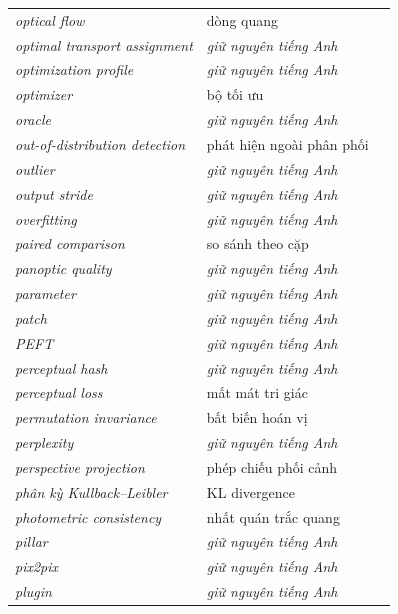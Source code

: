 \documentclass[deep_learning.tex]{subfiles}
\begin{document}
\begin{longtable}{@{}L{5.2cm}L{5.9cm}L{2.6cm}@{}}
\emph{optical flow} & dòng quang & \\
\emph{optimal transport assignment} & \emph{\color{tiercol}giữ nguyên tiếng Anh} & \\
\emph{optimization profile} & \emph{\color{tiercol}giữ nguyên tiếng Anh} & \\
\emph{optimizer} & bộ tối ưu & \\
\emph{oracle} & \emph{\color{tiercol}giữ nguyên tiếng Anh} & \\
\emph{out-of-distribution detection} & phát hiện ngoài phân phối & \\
\emph{outlier} & \emph{\color{tiercol}giữ nguyên tiếng Anh} & \\
\emph{output stride} & \emph{\color{tiercol}giữ nguyên tiếng Anh} & \\
\emph{overfitting} & \emph{\color{tiercol}giữ nguyên tiếng Anh} & \\
\emph{paired comparison} & so sánh theo cặp & \\
\emph{panoptic quality} & \emph{\color{tiercol}giữ nguyên tiếng Anh} & \\
\emph{parameter} & \emph{\color{tiercol}giữ nguyên tiếng Anh} & \\
\emph{patch} & \emph{\color{tiercol}giữ nguyên tiếng Anh} & \\
\emph{PEFT} & \emph{\color{tiercol}giữ nguyên tiếng Anh} & \\
\emph{perceptual hash} & \emph{\color{tiercol}giữ nguyên tiếng Anh} & \\
\emph{perceptual loss} & mất mát tri giác & \\
\emph{permutation invariance} & bất biến hoán vị & \\
\emph{perplexity} & \emph{\color{tiercol}giữ nguyên tiếng Anh} & \\
\emph{perspective projection} & phép chiếu phối cảnh & \\
\emph{phân kỳ Kullback--Leibler} & KL divergence & \\
\emph{photometric consistency} & nhất quán trắc quang & \\
\emph{pillar} & \emph{\color{tiercol}giữ nguyên tiếng Anh} & \\
\emph{pix2pix} & \emph{\color{tiercol}giữ nguyên tiếng Anh} & \\
\emph{plugin} & \emph{\color{tiercol}giữ nguyên tiếng Anh} & \\

\end{longtable}
\end{document}
